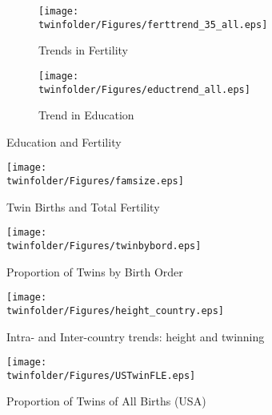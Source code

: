 \begin{figure}[htpb!]
\centering
\begin{subfigure}{.5\textwidth}
  \centering
  \texttt{[image: \\twinfolder/Figures/ferttrend\_35\_all.eps]}
  \caption{Trends in Fertility}
  \label{TWINfig:fertrend}
\end{subfigure}%
\begin{subfigure}{.5\textwidth}
  \centering
  \texttt{[image: \\twinfolder/Figures/eductrend\_all.eps]}
  \caption{Trend in Education}
  \label{TWINfig:eductrend}
\end{subfigure}
\caption{Education and Fertility}
\label{TWINfig:trends}
\end{figure}
\vspace{1cm}

\begin{figure}[htpb!]
\begin{center}
\caption{Twin Births and Total Fertility}
\label{TWINfig:births}
\texttt{[image: \\twinfolder/Figures/famsize.eps]} 
\end{center}
\end{figure}

\begin{figure}[htpb!]
\begin{center}
\caption{Proportion of Twins by Birth Order}
\label{TWINfig:bord}
\texttt{[image: \\twinfolder/Figures/twinbybord.eps]} 
\end{center}
\end{figure}

\begin{figure}[htpb!]
\begin{center}
\caption{Intra- and Inter-country trends: height and twinning}
\label{TWINfig:arrows}
\texttt{[image: \\twinfolder/Figures/height\_country.eps]} 
\end{center}
\end{figure}

\begin{figure}[htpb!]
\begin{center}
\caption{Proportion of Twins of All Births (USA)}
\label{TWINfig:USTwin}
\texttt{[image: \\twinfolder/Figures/USTwinFLE.eps]} 
\end{center}
\end{figure}

